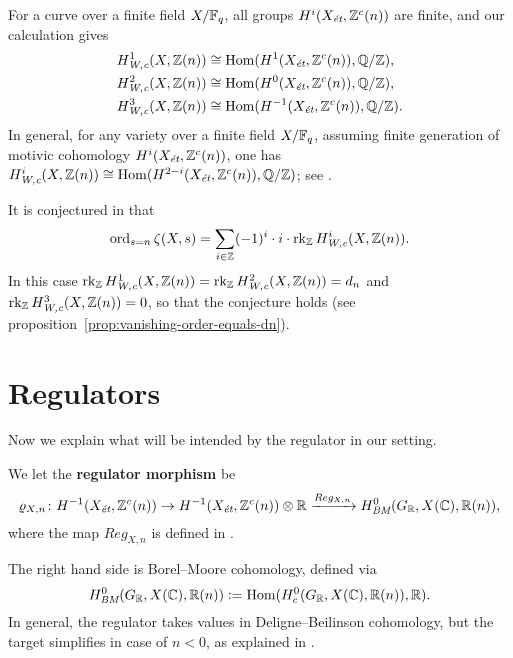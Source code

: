 \documentclass{article}
\numberwithin{equation}{section}
\begin{document}
\begin{remark}
  For a curve over a finite field $X/\FF_q$, all groups $H^i (X_\et, \ZZ^c(n))$
  are finite, and our calculation gives
  \begin{align*}
    H^1_\Wc (X, \ZZ(n)) & \cong \Hom (H^1 (X_\et, \ZZ^c(n)), \QQ/\ZZ), \\
    H^2_\Wc (X, \ZZ(n)) & \cong \Hom (H^0 (X_\et, \ZZ^c(n)), \QQ/\ZZ), \\
    H^3_\Wc (X, \ZZ(n)) & \cong \Hom (H^{-1} (X_\et, \ZZ^c(n)), \QQ/\ZZ).
  \end{align*}
  In general, for any variety over a finite field $X/\FF_q$, assuming finite
  generation of motivic cohomology $H^i (X_\et, \ZZ^c(n))$, one has
  $H^i_\Wc (X, \ZZ(n)) \cong \Hom (H^{2-i} (X_\et, \ZZ^c(n)), \QQ/\ZZ)$; see
  \cite[Proposition~7.7]{Beshenov-Weil-etale-1}.
\end{remark}

\begin{remark}
  It is conjectured in \cite[\S 3]{Beshenov-Weil-etale-2} that
  \[ \ord_{s = n} \zeta (X,s) =
    \sum_{i\in \ZZ} (-1)^i\cdot i\cdot\rk_\ZZ H^i_\Wc (X,\ZZ(n)). \]
  In this case $\rk_\ZZ H^1_\Wc (X,\ZZ(n)) = \rk_\ZZ H^2_\Wc (X,\ZZ(n)) = d_n$
  and $\rk_\ZZ H^3_\Wc (X,\ZZ(n)) = 0$, so that the conjecture holds
  (see proposition~\ref{prop:vanishing-order-equals-dn}).
\end{remark}


\section{Regulators}
\label{sec:regulators}

Now we explain what will be intended by the regulator in our setting.

\begin{definition}
  We let the \textbf{regulator morphism} be
  \[ \varrho_{X,n}\colon
    H^{-1} (X_\et, \ZZ^c (n)) \to
    H^{-1} (X_\et, \ZZ^c (n)) \otimes \RR \xrightarrow{Reg_{X,n}}
    H^0_\BM (G_\RR, X(\CC), \RR(n)), \]
  where the map $Reg_{X,n}$ is defined in \cite[\S 2]{Beshenov-Weil-etale-2}.
\end{definition}

The right hand side is Borel--Moore cohomology, defined via
\[ H^0_\BM (G_\RR, X(\CC), \RR(n)) \dfn
  \Hom (H^0_c (G_\RR, X(\CC), \RR(n)), \RR). \]
In general, the regulator takes values in Deligne--Beilinson cohomology, but the
target simplifies in case of $n < 0$, as explained in
\cite[\S 2]{Beshenov-Weil-etale-2}.
\end{document}
